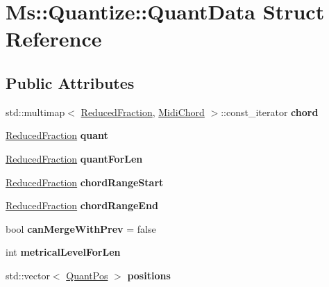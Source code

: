 \hypertarget{struct_ms_1_1_quantize_1_1_quant_data}{}\section{Ms\+:\+:Quantize\+:\+:Quant\+Data Struct Reference}
\label{struct_ms_1_1_quantize_1_1_quant_data}
\subsection*{Public Attributes}
\begin{DoxyCompactItemize}
\item 
\mbox{\label{struct_ms_1_1_quantize_1_1_quant_data_ad722eca5c411a9dbf06dadd550d5d7a9}} 
std\+::multimap$<$ \hyperlink{class_ms_1_1_reduced_fraction}{Reduced\+Fraction}, \hyperlink{class_ms_1_1_midi_chord}{Midi\+Chord} $>$\+::const\+\_\+iterator {\bfseries chord}
\item 
\mbox{\label{struct_ms_1_1_quantize_1_1_quant_data_a440584920aec733d01c107aa2a7b5656}} 
\hyperlink{class_ms_1_1_reduced_fraction}{Reduced\+Fraction} {\bfseries quant}
\item 
\mbox{\label{struct_ms_1_1_quantize_1_1_quant_data_a43f8a614bbb211f242faa55c3a0730c6}} 
\hyperlink{class_ms_1_1_reduced_fraction}{Reduced\+Fraction} {\bfseries quant\+For\+Len}
\item 
\mbox{\label{struct_ms_1_1_quantize_1_1_quant_data_afc1ec341002afdcec0afa97b5a14970e}} 
\hyperlink{class_ms_1_1_reduced_fraction}{Reduced\+Fraction} {\bfseries chord\+Range\+Start}
\item 
\mbox{\label{struct_ms_1_1_quantize_1_1_quant_data_a58bf4a0e162f19307ee04902f26b6ddf}} 
\hyperlink{class_ms_1_1_reduced_fraction}{Reduced\+Fraction} {\bfseries chord\+Range\+End}
\item 
\mbox{\label{struct_ms_1_1_quantize_1_1_quant_data_a2ed9bc82310af6a4bbbdbf07273499eb}} 
bool {\bfseries can\+Merge\+With\+Prev} = false
\item 
\mbox{\label{struct_ms_1_1_quantize_1_1_quant_data_a86124c2e61b820e3bdc13ee6962aca40}} 
int {\bfseries metrical\+Level\+For\+Len}
\item 
\mbox{\label{struct_ms_1_1_quantize_1_1_quant_data_a73dcc5440c086a145df2d53fd433beaa}} 
std\+::vector$<$ \hyperlink{struct_ms_1_1_quantize_1_1_quant_pos}{Quant\+Pos} $>$ {\bfseries positions}
\end{DoxyCompactItemize}


